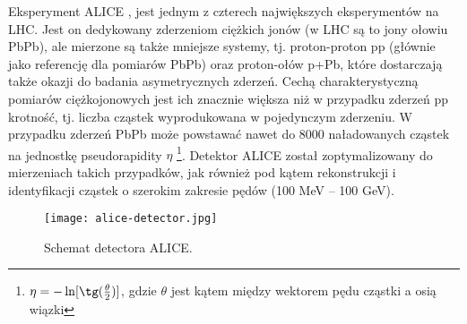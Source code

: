 Eksperyment ALICE \cite{Aamodt:2008zz}, \cite{Abelev:2014ffa} jest jednym z czterech największych eksperymentów na LHC. Jest on dedykowany zderzeniom ciężkich jonów (w LHC są to jony ołowiu PbPb), ale mierzone są także mniejsze systemy, tj. proton-proton pp (głównie jako referencję dla pomiarów PbPb) oraz proton-ołów p+Pb, które dostarczają także okazji do badania asymetrycznych zderzeń. Cechą charakterystyczną pomiarów ciężkojonowych jest ich znacznie większa niż w przypadku zderzeń pp krotność, tj. liczba cząstek wyprodukowana w pojedynczym zderzeniu. W przypadku zderzeń PbPb może powstawać nawet do 8000 naładowanych cząstek na jednostkę pseudorapidity $\eta$  \footnote{$\eta = -\ln[\tg(\frac{\theta}{2})]$, gdzie $\theta$ jest kątem między wektorem pędu cząstki a osią wiązki}. Detektor ALICE został zoptymalizowany do mierzeniach takich przypadków, jak również pod kątem rekonstrukcji i identyfikacji cząstek o szerokim zakresie pędów (100 MeV -- 100 GeV).


\begin{figure}[h]
	\centering
	\texttt{[image: alice-detector.jpg]}
	\caption{Schemat detectora ALICE.  }
	\label{fig:alice-detector}
\end{figure}


